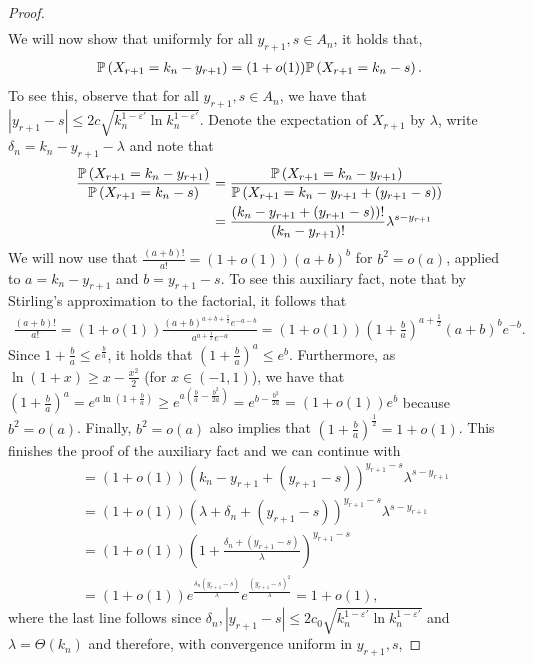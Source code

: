 \begin{proof}
\begin{align*}
\end{align*}
We will now show that uniformly for all $y_{r+1}, s \in A_n$, it holds that,
\begin{align}\label{eq:yrp1tos}
	\mathbb{P}\left(X_{r+1}=k_n-y_{r+1}\right) = (1+o(1))\mathbb{P}\left(X_{r+1}=k_n-s\right).
\end{align}
To see this, observe that for all $y_{r+1},s\in A_n$, we have that $|y_{r+1}-s|\leq 2c\sqrt{k_n^{1-\varepsilon'}\ln k_n^{1-\varepsilon'}}$. Denote the expectation of $X_{r+1}$ by $\lambda$, write $\delta_n = k_n-y_{r+1}-\lambda$ and note that
\begin{align*}
	\frac{\mathbb{P}\left(X_{r+1}=k_n-y_{r+1}\right)}{\mathbb{P}\left(X_{r+1}=k_n-s\right)} 
	&= \frac{\mathbb{P}\left(X_{r+1}=k_n-y_{r+1}\right)}{\mathbb{P}\left(X_{r+1}=k_n-y_{r+1}+(y_{r+1}-s)\right)}\\
	&=\frac{(k_n-y_{r+1}+(y_{r+1}-s))!}{(k_n-y_{r+1})!}\lambda^{s-y_{r+1}}
\end{align*}
We will now use that $\frac{(a+b)!}{a!} = (1+o(1))(a+b)^b$ for $b^2=o(a)$, applied to $a=k_n-y_{r+1}$ and $b=y_{r+1}-s$. To see this auxiliary fact, note that by Stirling's approximation to the factorial, it follows that
\begin{align*}
	\frac{(a+b)!}{a!}=(1+o(1))\frac{(a+b)^{a+b+\frac{1}{2}}e^{-a-b}}{a^{a+\frac{1}{2}}e^{-a}}
	=(1+o(1))\left(1+\frac{b}{a}\right)^{a+\frac{1}{2}}(a+b)^b e^{-b}.
\end{align*}
Since $1+\frac{b}{a}\leq e^{\frac{b}{a}}$, it holds that $(1+\frac{b}{a})^a \leq e^b$. Furthermore, as $\ln(1+x)\geq x-\frac{x^2}{2}$ (for $x\in (-1,1)$), we have that $(1+\frac{b}{a})^a =e^{a\ln(1+\frac{b}{a})}\geq e^{a(\frac{b}{a}-\frac{b^2}{2a})} =e^{b-\frac{b^2}{2a}}=(1+o(1))e^{b}$ because $b^2=o(a)$. Finally, $b^2=o(a)$ also implies that $(1+\frac{b}{a})^\frac{1}{2}=1+o(1)$. This finishes the proof of the auxiliary fact and we can continue with
\begin{align*}
	&=(1+o(1)) (k_n-y_{r+1}+(y_{r+1}-s))^{y_{r+1}-s} \lambda^{s-y_{r+1}} \\
	&=(1+o(1)) (\lambda+\delta_n+(y_{r+1}-s))^{y_{r+1}-s} \lambda^{s-y_{r+1}} \\
	&=(1+o(1))\left(1+\frac{\delta_n+(y_{r+1}-s)}{\lambda}\right)^{y_{r+1}-s} \\
	&=(1+o(1)) e^{\frac{\delta_n(y_{r+1}-s)}{\lambda}} e^{\frac{(y_{r+1}-s)^2}{\lambda}} = 1+o(1),
\end{align*}
where the last line follows since $\delta_n, |y_{r+1}-s| \leq 2c_0\sqrt{k_n^{1-\varepsilon'}\ln k_n^{1-\varepsilon'}}$ and $\lambda=\Theta(k_n)$ and therefore, with convergence uniform in $y_{r+1},s$,

\end{proof}
